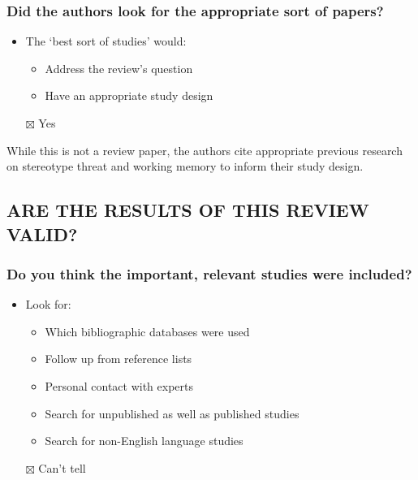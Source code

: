 \documentclass[
  doc, a4paper]{apa7}
\providecommand{\tightlist}{%
  \setlength{\itemsep}{0pt}\setlength{\parskip}{0pt}}
\begin{document}
\subsubsection{Did the authors look for the appropriate sort of papers?}\label{did-the-authors-look-for-the-appropriate-sort-of-papers}

\begin{itemize}
\tightlist
\item
  The `best sort of studies' would:

  \begin{itemize}
  \tightlist
  \item
    Address the review's question
  \item
    Have an appropriate study design
  \end{itemize}
\item[$\boxtimes$]
  Yes
\end{itemize}

While this is not a review paper, the authors cite appropriate previous research on stereotype threat and working memory to inform their study design.

\subsection{ARE THE RESULTS OF THIS REVIEW VALID?}\label{are-the-results-of-this-review-valid}

\subsubsection{Do you think the important, relevant studies were included?}\label{do-you-think-the-important-relevant-studies-were-included}

\begin{itemize}
\tightlist
\item
  Look for:

  \begin{itemize}
  \tightlist
  \item
    Which bibliographic databases were used
  \item
    Follow up from reference lists
  \item
    Personal contact with experts
  \item
    Search for unpublished as well as published studies
  \item
    Search for non-English language studies
  \end{itemize}
\item[$\boxtimes$]
  Can't tell
\end{itemize}
\end{document}
